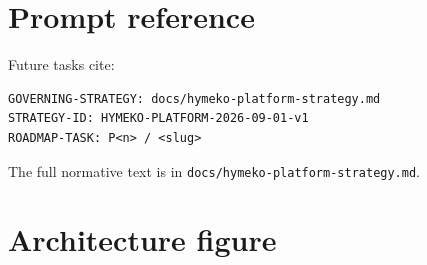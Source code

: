 \documentclass[11pt,a4paper]{article}
\begin{document}
\section{Prompt reference}
Future tasks cite:
\begin{verbatim}
GOVERNING-STRATEGY: docs/hymeko-platform-strategy.md
STRATEGY-ID: HYMEKO-PLATFORM-2026-09-01-v1
ROADMAP-TASK: P<n> / <slug>
\end{verbatim}
The full normative text is in \texttt{docs/hymeko-platform-strategy.md}.

\section{Architecture figure}

\end{document}
